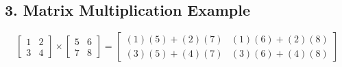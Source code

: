 \documentclass{article}
\begin{document}
\subsection{3. Matrix Multiplication Example}
\[
\begin{bmatrix}
1 & 2 \\
3 & 4
\end{bmatrix}
\times
\begin{bmatrix}
5 & 6 \\
7 & 8
\end{bmatrix}
= \begin{bmatrix}
(1)(5) + (2)(7) & (1)(6) + (2)(8) \\
(3)(5) + (4)(7) & (3)(6) + (4)(8)
\end{bmatrix}
\]
\end{document}
